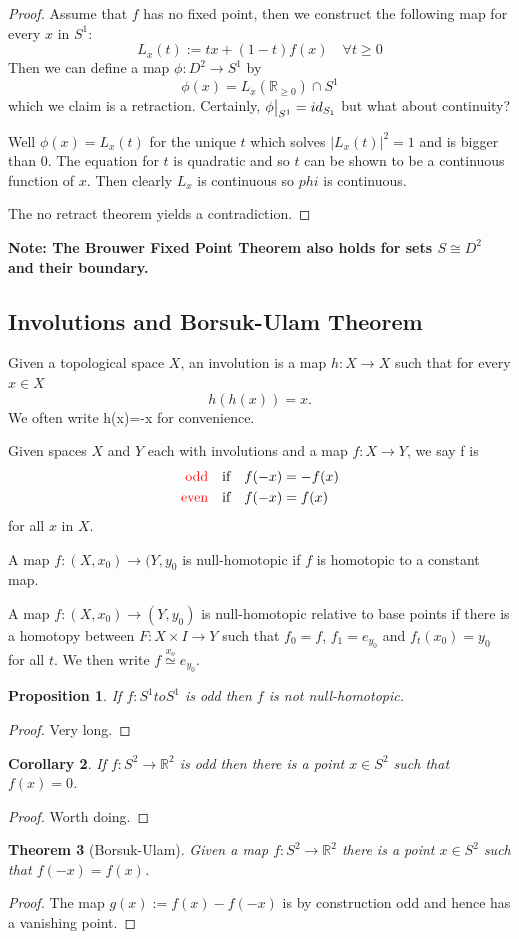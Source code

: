 \documentclass[11pt]{article}
\newcommand{\defeq}{:=}
\newcommand{\abs}[1]{|#1|}
\newcommand{\homrelset}[1]{\stackrel{#1}{\simeq}}
\newcommand\restr[2]{{%
  \left.\kern-\nulldelimiterspace %
  #1 %
  \vphantom{\big|} %
  \right|_{#2} %
  }}
\newcommand{\R}{\mathbb{R}}
\newenvironment{defin}
	{\begin{mdframed}[backgroundcolor=white, roundcorner=5pt, linewidth=1pt]
		\setlength{\parindent}{0pt}
		}
	{\end{mdframed}}
\newcommand{\mdf}[1]{{\color{red} #1}}
\newenvironment{note}
	{\begin{mdframed}[backgroundcolor=white, linecolor=red, roundcorner=5pt, linewidth=1pt]\bfseries{Note:}\normalfont}
	{\end{mdframed}}
\newtheorem{theorem}{Theorem}[section]
\newtheorem{prop}[theorem]{Proposition}
\newtheorem{cor}[theorem]{Corollary}
\begin{document}
\begin{proof}
Assume that $f$ has no fixed point, then we construct the following map for every $x$ in $S^1$:
\[
	L_x(t)\defeq tx+(1-t)f(x)\quad \forall t\geq 0
\]
Then we can define a map $\phi:D^2\to S^1$ by
\[
	\phi(x)=L_x(\R_{\geq 0})\cap S^1
\]
which we claim is a retraction.
Certainly, $\restr{\phi}{S^1}=id_{S_1}$ but what about continuity?

Well $\phi(x)=L_x(t)$ for the unique $t$ which solves $\abs{L_x(t)}^2=1$ and is bigger than 0.
The equation for $t$ is quadratic and so $t$ can be shown to be a continuous function of $x$.
Then clearly $L_x$ is continuous so $phi$ is continuous.

The no retract theorem yields a contradiction.
\end{proof}
\begin{note}
The Brouwer Fixed Point Theorem also holds for sets $S\cong D^2$ and their boundary.
\end{note}
\subsection{Involutions and Borsuk-Ulam Theorem}
\begin{defin}
	Given a topological space $X$, an \mdf{involution} is a map $h:X\to X$ such that for every $x\in X$
	\[
		h(h(x))=x.
	\]
	We often write h(x)=-x for convenience.

	Given spaces $X$ and $Y$ each with involutions and a map $f:X\to Y$, we say f is
	\begin{align*}
		\mdf{\text{odd}}\quad&\text{if}\quad f(-x)=-f(x) \\
		\mdf{\text{even}}\quad&\text{if}\quad f(-x)=f(x)
	\end{align*}
	for all $x$ in $X$.

	A map $f:(X,x_0)\to (Y,y_0$ is \mdf{null-homotopic} if $f$ is homotopic to a constant map.

	A map $f:(X,x_0)\to (Y,y_0)$ is \mdf{null-homotopic relative to base points} if there is a homotopy between $F:X\times I \to Y$ such that $f_0=f$, $f_1=e_{y_0}$ and $f_t(x_0)=y_0$ for all $t$.
	We then write $f\homrelset{x_o} e_{y_0}$.
\end{defin}
\begin{prop}
If $f:S^1 to S^1$ is odd then $f$ is not null-homotopic.
\end{prop}
\begin{proof}
Very long.
\end{proof}
\begin{cor}
	If $f:S^2 \to \R^2$ is odd then there is a point $x\in S^2$ such that $f(x)=0$.
\end{cor}
\begin{proof}
Worth doing.
\end{proof}
\begin{theorem}[Borsuk-Ulam]
Given a map $f:S^2\to\R^2$ there is a point $x\in S^2$ such that $f(-x)=f(x)$.
\end{theorem}
\begin{proof}
The map $g(x)\defeq f(x) - f(-x)$ is by construction odd and hence has a vanishing point.
\end{proof}
\end{document}

